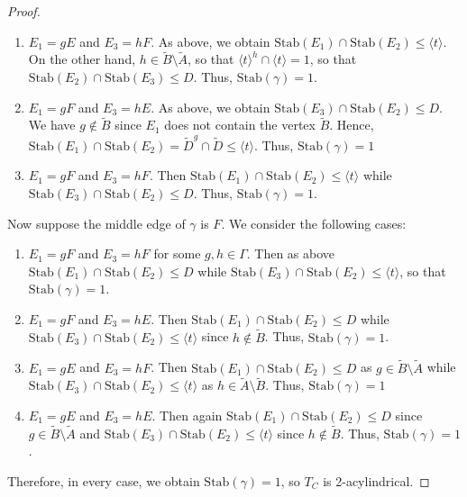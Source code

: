 \documentclass{amsart}
\theoremstyle{plain}
\theoremstyle{definition}
\theoremstyle{remark}
\begin{document}
\begin{proof}
\begin{enumerate}
        \item $E_1 = gE$ and $E_3 = hF$. As above, we obtain $\mathrm{Stab}(E_1) \cap \mathrm{Stab}(E_2) \leq \langle t \rangle$. On the other hand, $h \in \tilde{B} \setminus \tilde{A}$, so that $\langle t \rangle^h \cap \langle t \rangle = 1$, so that $\mathrm{Stab}(E_2) \cap \mathrm{Stab}(E_3) \leq D$. Thus, $\mathrm{Stab}(\gamma) = 1$.

        \item $E_1 = gF$ and $E_3 = hE$. As above, we obtain $\mathrm{Stab}(E_3) \cap \mathrm{Stab}(E_2) \leq D$. We have $g \notin \tilde{B}$ since $E_1$ does not contain the vertex $\tilde{B}$. Hence, $\mathrm{Stab}(E_1) \cap \mathrm{Stab}(E_2) = \tilde{D}^g \cap \tilde{D} \leq \langle t \rangle$. Thus, $\mathrm{Stab}(\gamma) = 1$

        \item $E_1 = gF$ and $E_3 = hF$. Then $\mathrm{Stab}(E_1) \cap \mathrm{Stab}(E_2) \leq \langle t \rangle$ while $\mathrm{Stab}(E_3) \cap \mathrm{Stab}(E_2) \leq D$. Thus, $\mathrm{Stab}(\gamma) = 1$.
        
    \end{enumerate}

    Now suppose the middle edge of $\gamma$ is $F$. We consider the following cases: 

    \begin{enumerate}
        \item $E_1 = gF$ and $E_3 = hF$ for some $g,h \in \Gamma$. Then as above $\mathrm{Stab}(E_1) \cap \mathrm{Stab}(E_2) \leq D$ while $\mathrm{Stab}(E_3) \cap \mathrm{Stab}(E_2) \leq \langle t \rangle$, so that $\mathrm{Stab}(\gamma) = 1$. 

        \item $E_1 = gF$ and $E_3 = hE$. Then $\mathrm{Stab}(E_1) \cap \mathrm{Stab}(E_2) \leq D$ while $\mathrm{Stab}(E_3) \cap \mathrm{Stab}(E_2) \leq \langle t \rangle$ since $h \notin \tilde{B}$. Thus, $\mathrm{Stab}(\gamma) = 1$.

        \item $E_1 = gE$ and $E_3 = hF$. Then $\mathrm{Stab}(E_1) \cap \mathrm{Stab}(E_2) \leq D$ as $g \in \tilde{B} \setminus \tilde{A}$ while $\mathrm{Stab}(E_3) \cap \mathrm{Stab}(E_2) \leq \langle t \rangle$ as $h \in \tilde{A} \setminus \tilde{B}$. Thus, $\mathrm{Stab}(\gamma) = 1$

        \item $E_1 = gE$ and $E_3 = hE$. Then again $\mathrm{Stab}(E_1) \cap \mathrm{Stab}(E_2) \leq D$ since $g \in \tilde{B} \setminus \tilde{A}$ and  $\mathrm{Stab}(E_3) \cap \mathrm{Stab}(E_2) \leq \langle t \rangle$ since $h \notin \tilde{B}$. Thus, $\mathrm{Stab}(\gamma) = 1$.
        
    \end{enumerate}

    Therefore, in every case, we obtain $\mathrm{Stab}(\gamma) = 1$, so $T_C$ is 2-acylindrical.

    
\end{proof}
\end{document}
